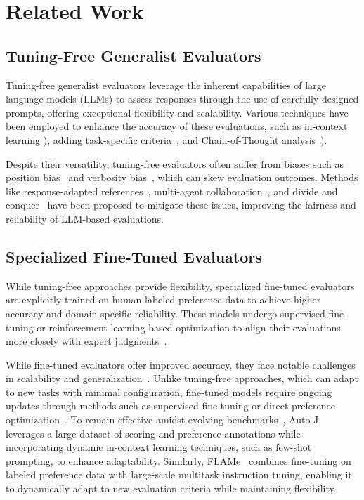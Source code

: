 \section{Related Work}
\subsection{Tuning-Free Generalist Evaluators}
Tuning-free generalist evaluators leverage the inherent capabilities of large language models (LLMs) to assess responses through the use of carefully designed prompts, offering exceptional flexibility and scalability. Various techniques have been employed to enhance the accuracy of these evaluations, such as in-context learning \cite{Fu2023GPTScoreEA,lin2023llm}), adding task-specific criteria~\cite{kotonya2023little,zhuo2024ice}, and Chain-of-Thought analysis~\cite{liu2023g,zhuo2024ice}). 

Despite their versatility, tuning-free evaluators often suffer from biases such as position bias~\cite{raina2024llm,wang2023large,zheng2023judging} and verbosity bias~\cite{khandebating,ye2024justice}, which can skew evaluation outcomes. Methods like response-adapted references~\cite{zhang2024reviseval}, multi-agent collaboration~\cite{xu2023towards}, and divide and conquer~\cite{branch-merge,li2023split} have been proposed to mitigate these issues, improving the fairness and reliability of LLM-based evaluations.

\subsection{Specialized Fine-Tuned Evaluators}
While tuning-free approaches provide flexibility, specialized fine-tuned evaluators are explicitly trained on human-labeled preference data to achieve higher accuracy and domain-specific reliability. These models undergo supervised fine-tuning or reinforcement learning-based optimization to align their evaluations more closely with expert judgments~\cite{auto-j,pandalm,prometheus,prometheus2, sorry-bench}.

While fine-tuned evaluators offer improved accuracy, they face notable challenges in scalability and generalization~\cite{sft_eval_limit}. Unlike tuning-free approaches, which can adapt to new tasks with minimal configuration, fine-tuned models require ongoing updates through methods such as supervised fine-tuning or direct preference optimization~\cite{rafailov2024direct}. To remain effective amidst evolving benchmarks~\cite{mtbench,llmbar}, Auto-J~\cite{auto-j} leverages a large dataset of scoring and preference annotations while incorporating dynamic in-context learning techniques, such as few-shot prompting, to enhance adaptability. Similarly, FLAMe~\cite{vu2024foundational} combines fine-tuning on labeled preference data with large-scale multitask instruction tuning, enabling it to dynamically adapt to new evaluation criteria while maintaining flexibility.

